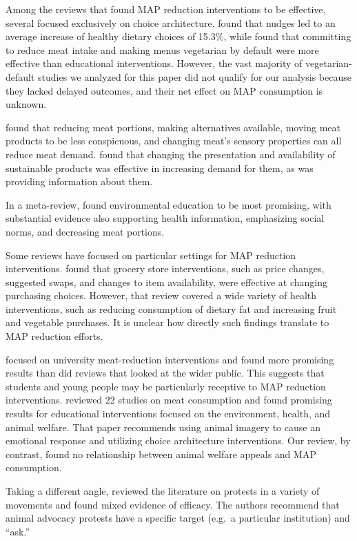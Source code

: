 \documentclass[sn-nature,referee,pdflatex]{sn-jnl}
\begin{document}
Among the reviews that found MAP reduction interventions to be
effective, several focused exclusively on choice architecture.
\citep{arno2016} found that nudges led to an average increase of healthy
dietary choices of 15.3\%, while \citep{byerly2018} found that
committing to reduce meat intake and making menus vegetarian by default
were more effective than educational interventions. However, the vast
majority of vegetarian-default studies we analyzed for this paper did
not qualify for our analysis because they lacked delayed outcomes, and
their net effect on MAP consumption is unknown.

\citep{bianchi2018restructuring} found that reducing meat portions,
making alternatives available, moving meat products to be less
conspicuous, and changing meat's sensory properties can all reduce meat
demand. \citep{pandey2023} found that changing the presentation and
availability of sustainable products was effective in increasing demand
for them, as was providing information about them.

In a meta-review, \citep{grundy2022} found environmental education to be
most promising, with substantial evidence also supporting health
information, emphasizing social norms, and decreasing meat portions.

Some reviews have focused on particular settings for MAP reduction
interventions. \citep{hartmannboyce2018} found that grocery store
interventions, such as price changes, suggested swaps, and changes to
item availability, were effective at changing purchasing choices.
However, that review covered a wide variety of health interventions,
such as reducing consumption of dietary fat and increasing fruit and
vegetable purchases. It is unclear how directly such findings translate
to MAP reduction efforts.

\citep{chang2023} focused on university meat-reduction interventions and
found more promising results than did reviews that looked at the wider
public. This suggests that students and young people may be particularly
receptive to MAP reduction interventions. \citep{harguess2020} reviewed
22 studies on meat consumption and found promising results for
educational interventions focused on the environment, health, and animal
welfare. That paper recommends using animal imagery to cause an
emotional response and utilizing choice architecture interventions. Our
review, by contrast, found no relationship between animal welfare
appeals and MAP consumption.

Taking a different angle, \citep{adleberg2018} reviewed the literature
on protests in a variety of movements and found mixed evidence of
efficacy. The authors recommend that animal advocacy protests have a
specific target (e.g.~a particular institution) and ``ask.''
\end{document}
